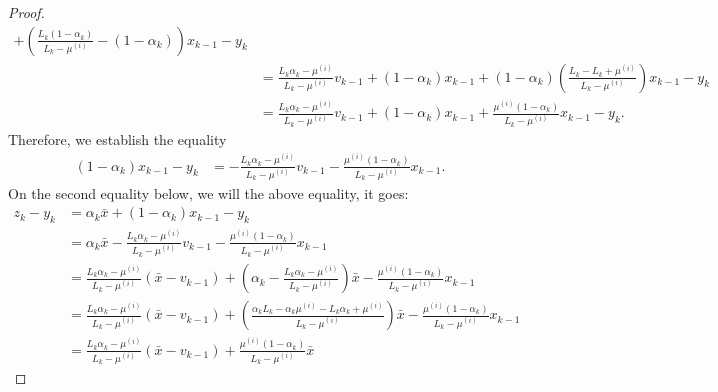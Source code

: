 \documentclass[12pt]{article}
\begin{document}
\begin{proof}
\begin{align*}
                + 
                \left(
                    \frac{L_k(1 - \alpha_k)}{L_k - \mu^{(i)}} - (1 - \alpha_k)
                \right) x_{k - 1} - y_k
                \\
                &= \frac{L_k\alpha_k - \mu^{(i)}}{L_k - \mu^{(i)}} v_{k - 1} + (1 - \alpha_k)x_{k - 1}
                + 
                (1 - \alpha_k)\left(
                    \frac{L_k - L_k + \mu^{(i)}}{L_k - \mu^{(i)}}
                \right) x_{k - 1} - y_k
                \\
                &= \frac{L_k\alpha_k - \mu^{(i)}}{L_k - \mu^{(i)}} v_{k - 1} + (1 - \alpha_k)x_{k - 1}
                + 
                \frac{\mu^{(i)}(1 - \alpha_k)}{L_k - \mu^{(i)}}x_{k - 1} - y_k. 
            \end{align*}
            Therefore, we establish the equality 
            \begin{align*}
                (1 - \alpha_k)x_{k - 1} - y_k &= 
                - \frac{L_k\alpha_k - \mu^{(i)}}{L_k - \mu^{(i)}} v_{k - 1} 
                - \frac{\mu^{(i)}(1 - \alpha_k)}{L_k - \mu^{(i)}} x_{k - 1}. 
            \end{align*}
            On the second equality below, we will the above equality, it goes: 
            \begin{align*}
                z_k - y_k &= 
                \alpha_k \bar x + (1 - \alpha_k)x_{k - 1} - y_k
                \\
                &= \alpha_k \bar x 
                - \frac{L_k\alpha_k - \mu^{(i)}}{L_k - \mu^{(i)}} v_{k - 1} 
                - \frac{\mu^{(i)}(1 - \alpha_k)}{L_k - \mu^{(i)}} x_{k - 1}
                \\
                &= \frac{L_k\alpha_k - \mu^{(i)}}{L_k - \mu^{(i)}}(\bar x - v_{k - 1})
                + \left(
                    \alpha_k - \frac{L_k\alpha_k - \mu^{(i)}}{L_k - \mu^{(i)}}
                \right)\bar x
                - \frac{\mu^{(i)}(1 - \alpha_k)}{L_k - \mu^{(i)}} x_{k - 1}
                \\
                &= \frac{L_k\alpha_k - \mu^{(i)}}{L_k - \mu^{(i)}}(\bar x - v_{k - 1})
                + \left(
                    \frac{\alpha_kL_k - \alpha_k \mu^{(i)} - L_k\alpha_k + \mu^{(i)}}{L_k - \mu^{(i)}}
                \right)\bar x
                - \frac{\mu^{(i)}(1 - \alpha_k)}{L_k - \mu^{(i)}} x_{k - 1}
                \\
                &= \frac{L_k\alpha_k - \mu^{(i)}}{L_k - \mu^{(i)}}(\bar x - v_{k - 1})
                + \frac{\mu^{(i)}(1 - \alpha_k)}{L_k - \mu^{(i)}}\bar x

\end{align*}
\end{proof}
\end{document}
